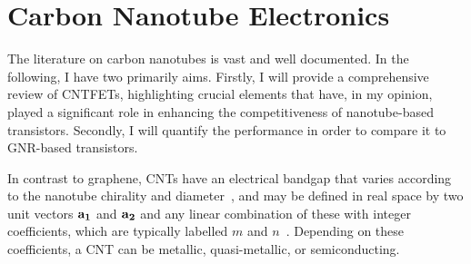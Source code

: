 \section{Carbon Nanotube Electronics}\label{intro:sec:cnt}

The literature on carbon nanotubes is vast and well documented. In the following, I have two primarily aims. Firstly, I will provide a comprehensive review of \glspl{CNTFET}, highlighting crucial elements that have, in my opinion, played a significant role in enhancing the competitiveness of nanotube-based transistors. Secondly, I will quantify the performance in order to compare it to \gls{GNR}-based transistors.

In contrast to graphene, \glspl{CNT} have an electrical bandgap that varies according to the nanotube chirality and diameter~\cite{dresselhaus2000carbon}, and may be defined in real space by two unit vectors $\boldsymbol{\mathbf{a_1}}$ and $\boldsymbol{\mathbf{a_2}}$ and any linear combination of these with integer coefficients, which are typically labelled $m$ and $n$~\cite{dresselhaus1998physical}. Depending on these coefficients, a \gls{CNT} can be metallic, quasi-metallic, or semiconducting.

